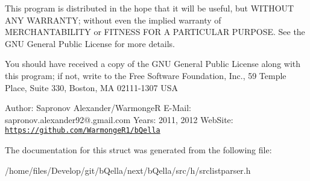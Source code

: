 This program is distributed in the hope that it will be useful, but WITHOUT ANY WARRANTY; without even the implied warranty of MERCHANTABILITY or FITNESS FOR A PARTICULAR PURPOSE. See the GNU General Public License for more details.

You should have received a copy of the GNU General Public License along with this program; if not, write to the Free Software Foundation, Inc., 59 Temple Place, Suite 330, Boston, MA 02111-\/1307 USA

Author: Sapronov Alexander/WarmongeR E-\/Mail: sapronov.alexander92@.gmail.com Years: 2011, 2012 WebSite: \href{https://github.com/WarmongeR1/bQella}{\tt https://github.com/WarmongeR1/bQella} 

The documentation for this struct was generated from the following file:\begin{DoxyCompactItemize}
\item 
/home/files/Develop/git/bQella/next/bQella/src/h/srclistparser.h\end{DoxyCompactItemize}
